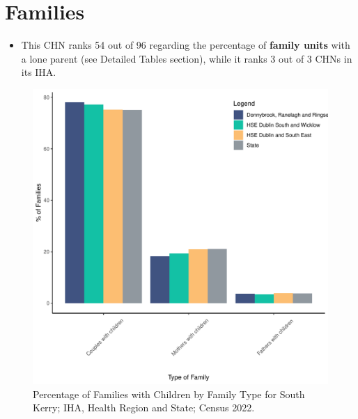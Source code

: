 \documentclass{article}
\begin{document}
\section{Families}\label{sect:Fam}
\begin{itemize}
\item This CHN ranks  54 out of 96 regarding the percentage of \textbf{family units} with a lone parent (see Detailed Tables section), while it ranks   3 out of 3 CHNs in its IHA.
\end{itemize}
\begin{figure}[H]
	\centering
	\includegraphics[width = 150mm]{../figures/FamED.pdf}
	\caption{Percentage of Families with Children by Family Type for South Kerry; IHA, Health Region and State; Census 2022.}
	\label{fig:vbnv}
	\end{figure}
	
\end{document}
